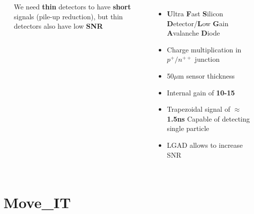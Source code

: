 \documentclass[aspectratio=169]{beamer}
\begin{document}
\begin{frame}
\begin{columns}
\begin{columns}
\begin{center}
			\end{center}
		\begin{center}
			We need \textbf{thin} detectors to have \textbf{short} signals (pile-up reduction), but thin detectors also have low \textbf{SNR}
		\end{center}
	\end{columns}
		\begin{itemize}
			\item \textbf{U}ltra \textbf{F}ast \textbf{S}ilicon \textbf{D}etector/\textbf{L}ow \textbf{G}ain \textbf{A}valanche \textbf{D}iode
			\item Charge multiplication in $p^+ / n^{++}$ junction 
			\item 50$\mu$m sensor thickness
			\item Internal gain of \textbf{10-15} 
			\item Trapezoidal signal of $\approx$\textbf{1.5ns}\newline
				{\color{blue} Capable of detecting single particle }
			\item LGAD allows to increase SNR 
		\end{itemize}
	\end{columns}
	\end{frame}

	\section{Move\_IT}
	
\end{document}
